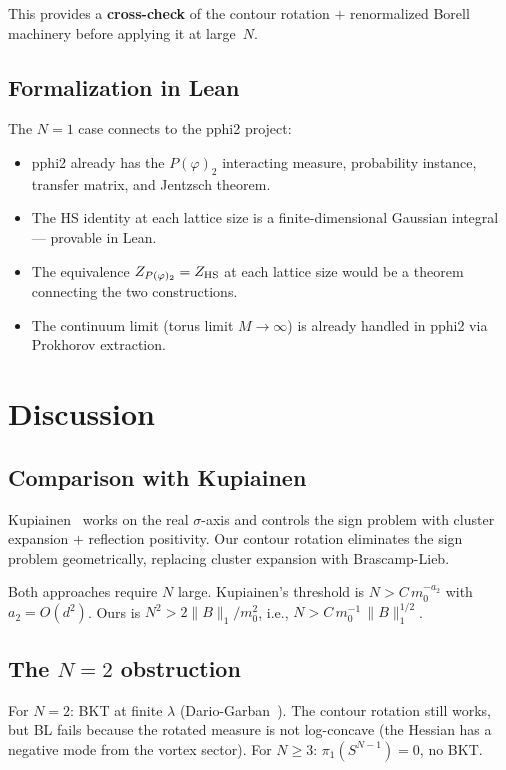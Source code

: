 \documentclass[12pt]{article}
\theoremstyle{definition}
\theoremstyle{remark}
\newcommand{\ph}{\varphi}
\begin{document}
This provides a \textbf{cross-check} of the contour rotation $+$
renormalized Borell machinery before applying it at large~$N$.

\subsection{Formalization in Lean}

The $N=1$ case connects to the pphi2 project:
\begin{itemize}
\item pphi2 already has the $P(\ph)_2$ interacting measure,
  probability instance, transfer matrix, and Jentzsch theorem.
\item The HS identity at each lattice size is a finite-dimensional
  Gaussian integral --- provable in Lean.
\item The equivalence $Z_{P(\ph)_2} = Z_{\rm HS}$ at each lattice
  size would be a theorem connecting the two constructions.
\item The continuum limit (torus limit $M \to \infty$) is already
  handled in pphi2 via Prokhorov extraction.
\end{itemize}

\section{Discussion}

\subsection{Comparison with Kupiainen}

Kupiainen~\cite{Kupiainen80} works on the real $\sigma$-axis and
controls the sign problem with cluster expansion $+$ reflection
positivity. Our contour rotation eliminates the sign problem
geometrically, replacing cluster expansion with Brascamp-Lieb.

Both approaches require $N$ large. Kupiainen's threshold is
$N > C\,m_0^{-a_2}$ with $a_2 = O(d^2)$. Ours is
$N^2 > 2\|B\|_1/m_0^2$, i.e., $N > C\,m_0^{-1}\,\|B\|_1^{1/2}$.

\subsection{The $N = 2$ obstruction}

For $N = 2$: BKT at finite $\lambda$ (Dario-Garban~\cite{DG25}).
The contour rotation still works, but BL fails because the rotated
measure is not log-concave (the Hessian has a negative mode from
the vortex sector). For $N \ge 3$: $\pi_1(S^{N-1}) = 0$, no BKT.
\end{document}
